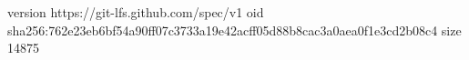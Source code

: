 version https://git-lfs.github.com/spec/v1
oid sha256:762e23eb6bf54a90ff07c3733a19e42acff05d88b8cac3a0aea0f1e3cd2b08c4
size 14875
